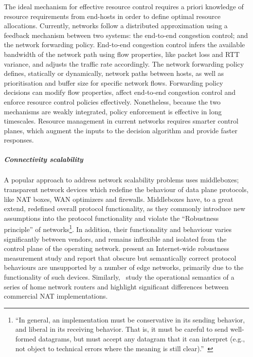 The ideal mechanism for effective resource control requires a priori knowledge
of resource requirements from end-hosts in order to define optimal resource
allocations.  Currently, networks follow a distributed approximation using a
feedback mechanism between two systems: the end-to-end congestion control; and
the network forwarding policy.  End-to-end congestion control infers the
available bandwidth of the network path using flow properties, like packet loss
and RTT variance, and adjusts the traffic rate accordingly. The network
forwarding policy defines, statically or dynamically, network paths between
hosts, as well as prioritisation and buffer size for specific network flows.
Forwarding policy decisions can modify flow properties, affect end-to-end
congestion control and enforce resource control policies effectively.
Nonetheless, because the two mechanisms are weakly integrated, policy
enforcement is effective in long timescales.  Resource management in current
networks requires smarter control planes, which augment the inputs to the
decision algorithm and provide faster responses.

\subparagraph*{Connectivity scalability} 

A popular approach to address network scalability problems uses middleboxes;
transparent network devices which redefine the behaviour of data plane
protocols, like NAT boxes, WAN optimizers and firewalls.  Middleboxes have,
 to a great extend, redefined overall protocol functionality, as they commonly
introduce new assumptions into the protocol functionality and violate the
``Robustness principle'' of networks\footnote{``In general, an implementation must
be conservative in its sending behavior, and liberal in its receiving behavior.
That is, it must be careful to send well-formed datagrams, but must accept any
datagram that it can interpret (e.g., not object to technical errors where the
meaning is still clear).''~}. In addition, their functionality
and behaviour varies significantly between vendors, and remains inflexible and
isolated from the control plane of the operating network. 
present an Internet-wide robustness measurement study and report that obscure
but semantically correct protocol behaviours are unsupported by a number of
edge networks, primarily due to the functionality of such devices.
Similarly,~ study the operational semantics of a series of
home network routers and highlight significant differences between commercial NAT
implementations. 

